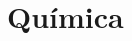 \documentclass[../main]{subfiles}
\begin{document}
\part{Química}
\label{part:quimica}
\end{document}
